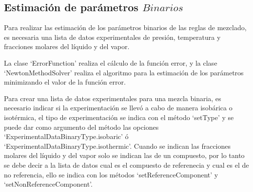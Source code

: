 
\newcommand{\binaryDiagram}[1] {
\begin{tikzpicture}
\begin{axis}[xlabel={Fración molar del metanol},ylabel=\temperature,legend entries={Experimentales líquido,Experimentales vapor,Calculados líquido,Calculados Vapor},legend style={at={(1.03,0.5)},anchor=west,font=\footnotesize}]
\addplot[amber,only marks,mark size = 1pt]table[x=x1, y=expTemp]{#1};
\addplot[blue,only marks,mark size = 1pt]table[x=yExp, y=expTemp]{#1};
\addplot[green,thick] table[x=x1, y=calcTemp]{#1};
\addplot[red,thick] table[x=yCalc, y=calcTemp]{#1};
\end{axis}
\end{tikzpicture}
 }
\newcommand{\alphaDiagram}[1]{
\begin{tikzpicture}
\begin{axis}
\addplot[blue,only marks,mark size = 1pt]table[x=temperature, y=expPressure]{#1};
\addplot[red,thick]table[x=temperature, y=calcPressure]{#1};
\end{axis}
\end{tikzpicture}
}



\subsection{Estimación de parámetros $Binarios$}\label{sec:binaryoptim}

	Para realizar las estimación de los parámetros binarios de las reglas de mezclado, es necesaria una lista de datos experimentales de presión, temperatura y fracciones molares del líquido y del vapor.

	La clase `ErrorFunction' realiza el cálculo de la función error, y la clase `NewtonMethodSolver' realiza el algoritmo para la estimación de los parámetros minimizando el valor de la función error.

	Para crear una lista de datos experimentales para una mezcla binaria, es necesario indicar si la experimentación se llevó a cabo de manera isobárica o isotérmica, el tipo de experimentación se indica con el método `setType' y se puede dar como argumento del método las opciones `ExperimentalDataBinaryType.isobaric' ó  `ExperimentalDataBinaryType.isothermic'. Cuando se indican las fracciones molares del líquido y del vapor solo se indican las de un compuesto, por lo tanto se debe decir a la lista de datos cual es el compuesto de referenecia y cual es el de no referencia, ello se indica con los métodos `setReferenceComponent' y `setNonReferenceComponent'.

